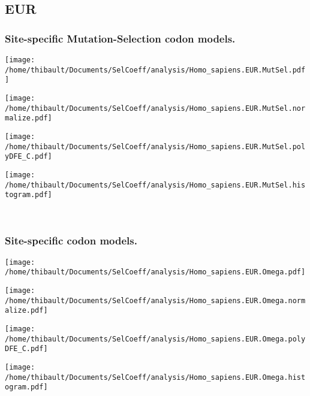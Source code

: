 \subsection{EUR} 
 
\subsubsection*{Site-specific Mutation-Selection codon models.} 
\begin{minipage}{0.49\linewidth} 
\texttt{[image: /home/thibault/Documents/SelCoeff/analysis/Homo\_sapiens.EUR.MutSel.pdf]} 
\end{minipage}
\begin{minipage}{0.49\linewidth} 
\texttt{[image: /home/thibault/Documents/SelCoeff/analysis/Homo\_sapiens.EUR.MutSel.normalize.pdf]} 
\end{minipage}
\begin{minipage}{0.49\linewidth} 
\texttt{[image: /home/thibault/Documents/SelCoeff/analysis/Homo\_sapiens.EUR.MutSel.polyDFE\_C.pdf]} 
\end{minipage}
\begin{minipage}{0.49\linewidth} 
\texttt{[image: /home/thibault/Documents/SelCoeff/analysis/Homo\_sapiens.EUR.MutSel.histogram.pdf]} 
\end{minipage}
\\ 
\subsubsection*{Site-specific codon models.} 
\begin{minipage}{0.49\linewidth} 
\texttt{[image: /home/thibault/Documents/SelCoeff/analysis/Homo\_sapiens.EUR.Omega.pdf]} 
\end{minipage}
\begin{minipage}{0.49\linewidth} 
\texttt{[image: /home/thibault/Documents/SelCoeff/analysis/Homo\_sapiens.EUR.Omega.normalize.pdf]} 
\end{minipage}
\begin{minipage}{0.49\linewidth} 
\texttt{[image: /home/thibault/Documents/SelCoeff/analysis/Homo\_sapiens.EUR.Omega.polyDFE\_C.pdf]} 
\end{minipage}
\begin{minipage}{0.49\linewidth} 
\texttt{[image: /home/thibault/Documents/SelCoeff/analysis/Homo\_sapiens.EUR.Omega.histogram.pdf]} 
\end{minipage}
\\ 
